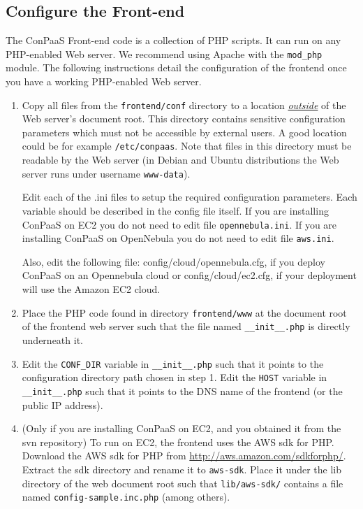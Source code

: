 \documentclass[10pt]{article}
\begin{document}
\subsection{Configure the Front-end}

The ConPaaS Front-end code is a collection of PHP scripts. It can run
on any PHP-enabled Web server. We recommend using Apache with the
\verb+mod_php+ module. The following instructions detail the
configuration of the frontend once you have a working PHP-enabled Web
server.

\begin{enumerate}
\item Copy all files from the \verb+frontend/conf+ directory to a
  location \uline{\emph{outside}} of the Web server's document root.
  This directory contains sensitive configuration parameters which
  must not be accessible by external users. A good location could be
  for example \verb+/etc/conpaas+. Note that files in this
  directory must be readable by the Web server (in Debian and Ubuntu
  distributions the Web server runs under username \verb+www-data+).

  Edit each of the .ini files to setup the required configuration
  parameters. Each variable should be described in the config file
  itself. If you are installing ConPaaS on EC2 you do not need to edit
  file \verb+opennebula.ini+. If you are installing ConPaaS on
  OpenNebula you do not need to edit file \verb+aws.ini+.

  Also, edit the following file: config/cloud/opennebula.cfg, if you
  deploy ConPaaS on an Opennebula cloud or config/cloud/ec2.cfg, if
  your deployment will use the Amazon EC2 cloud.

\item Place the PHP code found in directory \verb+frontend/www+ at the
  document root of the frontend web server such that the file named
  \verb+__init__.php+ is directly underneath it.

\item Edit the \verb+CONF_DIR+ variable in \verb+__init__.php+ such
  that it points to the configuration directory path chosen in step 1.
  Edit the \verb+HOST+ variable in \verb+__init__.php+ such that
  it points to the DNS name of the frontend (or the public IP address).

\item (Only if you are installing ConPaaS on EC2, and you obtained it 
  from the svn repository) To run on EC2, the frontend uses the AWS
  sdk for PHP. Download the AWS sdk for PHP from
  \url{http://aws.amazon.com/sdkforphp/}.  Extract the sdk directory
  and rename it to \verb+aws-sdk+. Place it under the lib directory of
  the web document root such that \verb+lib/aws-sdk/+ contains a
  file named \verb+config-sample.inc.php+ (among others).


\end{enumerate}
\end{document}
